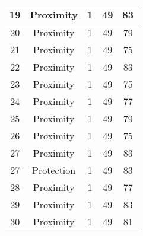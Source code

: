 \documentclass[results.tex]{subfiles}
\begin{document}
\begin{center}
\begin{tabular}{| c || c | c | c | c |}
            \hline
            19                      & Proximity                    & 1                      & 49                      & 83                   \\
            \hline
            20                      & Proximity                    & 1                      & 49                      & 79                   \\
            \hline
            21                      & Proximity                    & 1                      & 49                      & 75                   \\
            \hline
            22                      & Proximity                    & 1                      & 49                      & 83                   \\
            \hline
            23                      & Proximity                    & 1                      & 49                      & 75                   \\
            \hline
            24                      & Proximity                    & 1                      & 49                      & 77                   \\
            \hline
            25                      & Proximity                    & 1                      & 49                      & 79                   \\
            \hline
            26                      & Proximity                    & 1                      & 49                      & 75                   \\
            \hline
            27                      & Proximity                    & 1                      & 49                      & 83                   \\
            \hline
            27                      & Protection                   & 1                      & 49                      & 83                   \\
            \hline
            28                      & Proximity                    & 1                      & 49                      & 77                   \\
            \hline
            29                      & Proximity                    & 1                      & 49                      & 83                   \\
            \hline
            30                      & Proximity                    & 1                      & 49                      & 81                   \\

\end{tabular}
\end{center}
\end{document}

